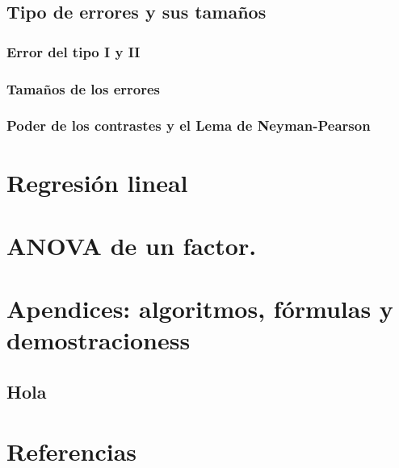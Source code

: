 \documentclass[]{book}
\theoremstyle{definition}
\theoremstyle{definition}
\theoremstyle{definition}
\theoremstyle{remark}
\begin{document}
\hypertarget{tipo-de-errores-y-sus-tamauxf1os}{%
\section{Tipo de errores y sus tamaños}\label{tipo-de-errores-y-sus-tamauxf1os}}

\hypertarget{error-del-tipo-i-y-ii}{%
\subsection{Error del tipo I y II}\label{error-del-tipo-i-y-ii}}

\hypertarget{tamauxf1os-de-los-errores}{%
\subsection{Tamaños de los errores}\label{tamauxf1os-de-los-errores}}

\hypertarget{poder-de-los-contrastes-y-el-lema-de-neyman-pearson}{%
\subsection{Poder de los contrastes y el Lema de Neyman-Pearson}\label{poder-de-los-contrastes-y-el-lema-de-neyman-pearson}}

\hypertarget{regre}{%
\chapter{Regresión lineal}\label{regre}}

\hypertarget{anova}{%
\chapter{ANOVA de un factor.}\label{anova}}

\hypertarget{apendices-algoritmos-fuxf3rmulas-y-demostracioness}{%
\chapter*{Apendices: algoritmos, fórmulas y demostracioness}\label{apendices-algoritmos-fuxf3rmulas-y-demostracioness}}

\hypertarget{hola}{%
\section{Hola}\label{hola}}

\hypertarget{referencias}{%
\chapter*{Referencias}\label{referencias}}


\end{document}
